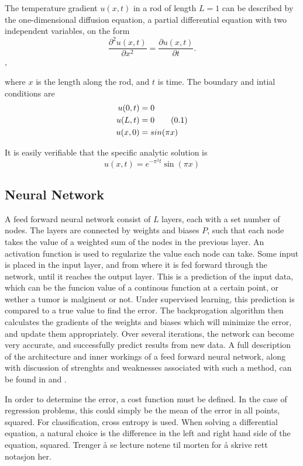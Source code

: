 \documentclass[multicolumn, 12pt]{extarticle}
\newcommand\numberthis{\addtocounter{equation}{1}\tag{\theequation}}
\begin{document}
The temperature gradient $u(x, t)$ in a rod of length $L=1$ can be described by the one-dimensional diffusion equation, a partial differential equation with two independent variables, on the form
\begin{equation}
	\label{eq:diff}
	\frac{\partial^2 u(x, t) }{\partial x^2} = \frac{\partial u(x, t)}{\partial t}.
\end{equation},

where $x$ is the length along the rod, and $t$ is time. The boundary and intial conditions are
\begin{align*}
	\label{eq:boundary}
	u(0, t) & = 0             \\
	u(L, t) & = 0 \numberthis \\
	u(x, 0) & = sin(\pi x)
\end{align*}

It is easily verifiable that the specific analytic solution is
\begin{equation*}
	u(x, t) = e^{-\pi^2t}\sin(\pi x)
\end{equation*}


\subsection{Neural Network}
A feed forward neural network consist of $L$ layers, each with a set number of nodes. The layers are connected by weights and biases $P$, such that each node takes the value of a weighted sum of the nodes in the previous layer. An activation function is used to regularize the value each node can take. Some input is placed in the input layer, and from where it is fed forward through the network, until it reaches the output layer. This is a prediction of the input data, which can be the funcion value of a continous function at a certain point, or wether a tumor is malginent or not. Under supervised learning, this prediction is compared to a true value to find the error. The backprogation algorithm then calculates the gradients of the weights and biases which will minimize the error, and update them appropriately. Over several iterations, the network can become very accurate, and successfully predict results from new data. A full description of the architecture and inner workings of a feed forward neural network, along with discussion of strenghts and weaknesses associated with such a method, can be found in \cite{p2S} and \cite{p2HO}.

In order to determine the error, a cost function must be defined. In the case of regression problems, this could simply be the mean of the error in all points, squared. For classification, cross entropy is used. When solving a differential equation, a natural choice is the difference in the left and right hand side of the equation, squared. Trenger å se lecture notene til morten for å skrive rett notasjon her.
\end{document}

